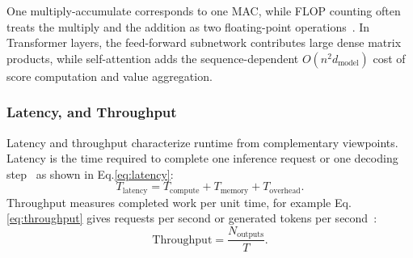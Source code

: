 One multiply-accumulate corresponds to one MAC, while FLOP counting often treats the multiply and the addition as two floating-point operations~\cite{NVIDIAMatrixMultiplication}. In Transformer layers, the feed-forward subnetwork contributes large dense matrix products, while self-attention adds the sequence-dependent $O(n^2 d_{\text{model}})$ cost of score computation and value aggregation.


\subsubsection{Latency, and Throughput}


Latency and throughput characterize runtime from complementary viewpoints. Latency is the time required to complete one inference request or one decoding step~\cite{Sze2017EfficientDNN} as shown in Eq.\eqref{eq:latency}:
\begin{equation}
	\label{eq:latency}
	T_{\text{latency}} = T_{\text{compute}} + T_{\text{memory}} + T_{\text{overhead}}.
\end{equation}
Throughput measures completed work per unit time, for example Eq.\eqref{eq:throughput} gives
requests per second or generated tokens per second~\cite{Sze2017EfficientDNN}:
\begin{equation}
	\label{eq:throughput}
	\mathrm{Throughput} = \frac{N_{\text{outputs}}}{T}.
\end{equation}
